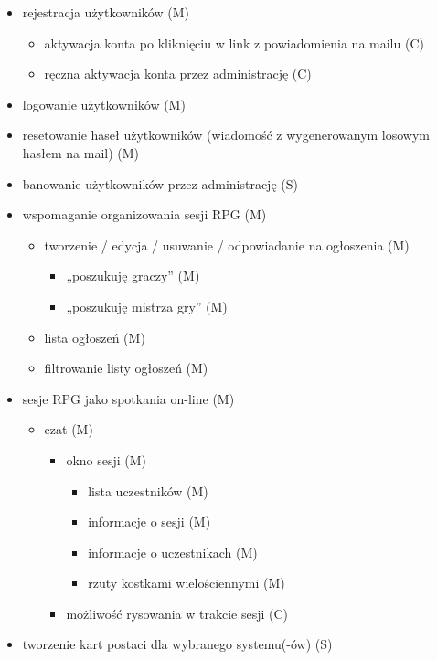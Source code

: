 \renewcommand{\labelitemi}{$\bullet$}
\renewcommand{\labelitemii}{$\circ$}

\begin{itemize}
\item rejestracja użytkowników (M)
	\begin{itemize}
	\item aktywacja konta po kliknięciu w link z powiadomienia na mailu (C)
	\item ręczna aktywacja konta przez administrację (C)
	\end{itemize}
\item logowanie użytkowników (M)
\item resetowanie haseł użytkowników (wiadomość z wygenerowanym losowym hasłem na mail) (M)
\item banowanie użytkowników przez administrację (S)
\item wspomaganie organizowania sesji RPG (M)
	\begin{itemize}
	\item tworzenie / edycja / usuwanie / odpowiadanie na ogłoszenia (M)
		\begin{itemize}
		\item „poszukuję graczy” (M)
		\item „poszukuję mistrza gry” (M)
		\end{itemize}
	\item lista ogłoszeń (M)
	\item filtrowanie listy ogłoszeń (M)
	\end{itemize}
\item sesje RPG jako spotkania on-line (M)
	\begin{itemize}
	\item czat (M)
		\begin{itemize}
		\item okno sesji (M)
			\begin{itemize}
			\item lista uczestników (M)
			\item informacje o sesji (M)
			\item informacje o uczestnikach (M)
			\item rzuty kostkami wielościennymi (M)
			\end{itemize}
		\item możliwość rysowania w trakcie sesji (C)
		\end{itemize}
	\end{itemize}
\item tworzenie kart postaci dla wybranego systemu(-ów) (S)

\end{itemize}
